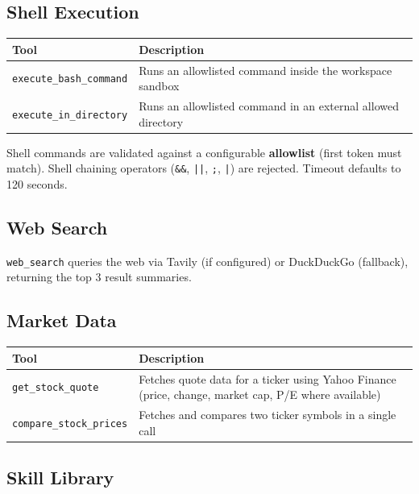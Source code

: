 \documentclass[11pt,a4paper]{article}
\begin{document}
\subsection{Shell Execution}

\begin{table}[h!]
\centering
\begin{tabular}{@{}lp{9cm}@{}}
\toprule
\textbf{Tool} & \textbf{Description} \\
\midrule
\texttt{execute\_bash\_command} & Runs an allowlisted command inside the workspace sandbox \\
\texttt{execute\_in\_directory} & Runs an allowlisted command in an external allowed directory \\
\bottomrule
\end{tabular}
\end{table}

\begin{notebox}
Shell commands are validated against a configurable \textbf{allowlist} (first token must match).  Shell chaining operators (\texttt{\&\&}, \texttt{||}, \texttt{;}, \texttt{|}) are rejected.  Timeout defaults to 120 seconds.
\end{notebox}

\subsection{Web Search}

\texttt{web\_search} queries the web via Tavily (if configured) or DuckDuckGo (fallback), returning the top 3 result summaries.

\subsection{Market Data}

\begin{table}[h!]
\centering
\begin{tabular}{@{}lp{9cm}@{}}
\toprule
\textbf{Tool} & \textbf{Description} \\
\midrule
\texttt{get\_stock\_quote} & Fetches quote data for a ticker using Yahoo Finance (price, change, market cap, P/E where available) \\
\texttt{compare\_stock\_prices} & Fetches and compares two ticker symbols in a single call \\
\bottomrule
\end{tabular}
\end{table}

\subsection{Skill Library}
\end{document}
